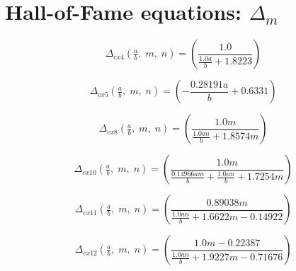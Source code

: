 \documentclass[11pt]{article}
\begin{document}
\section*{Hall-of-Fame equations: $\Delta_m$}


\begin{equation}
\label{eqd:cx4}
\Delta_{cx4}\!\left(\tfrac{a}{b},\; m,\; n\right) = \left(\frac{1.0}{\frac{1.0 a}{b} + 1.8223}\right)
\end{equation}

\begin{equation}
\label{eqd:cx5}
\Delta_{cx5}\!\left(\tfrac{a}{b},\; m,\; n\right) = \left(- \frac{0.28191 a}{b} + 0.6331\right)
\end{equation}

\begin{equation}
\label{eqd:cx8}
\Delta_{cx8}\!\left(\tfrac{a}{b},\; m,\; n\right) = \left(\frac{1.0 m}{\frac{1.0 a n}{b} + 1.8574 m}\right)
\end{equation}

\begin{equation}
\label{eqd:cx10}
\Delta_{cx10}\!\left(\tfrac{a}{b},\; m,\; n\right) = \left(\frac{1.0 m}{\frac{0.14966 a m}{b} + \frac{1.0 a n}{b} + 1.7254 m}\right)
\end{equation}

\begin{equation}
\label{eqd:cx11}
\Delta_{cx11}\!\left(\tfrac{a}{b},\; m,\; n\right) = \left(\frac{0.89038 m}{\frac{1.0 a n}{b} + 1.6622 m - 0.14922}\right)
\end{equation}

\begin{equation}
\label{eqd:cx12}
\Delta_{cx12}\!\left(\tfrac{a}{b},\; m,\; n\right) = \left(\frac{1.0 m - 0.22387}{\frac{1.0 a n}{b} + 1.9227 m - 0.71676}\right)
\end{equation}
\end{document}
